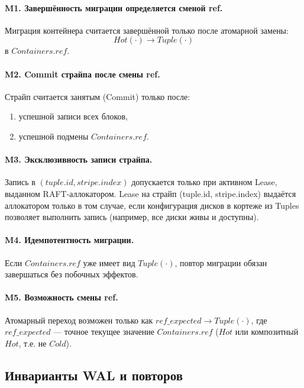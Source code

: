 \documentclass[a4paper,12pt]{article}
\begin{document}
    \paragraph{M1. Завершённость миграции определяется сменой ref.}
    Миграция контейнера считается завершённой только после атомарной замены:
    \[
        Hot(\cdot) \rightarrow Tuple(\cdot)
    \]
    в $Containers.ref$.

    \paragraph{M2. Commit страйпа после смены ref.}
    Страйп считается занятым (Commit) только после:
    \begin{enumerate}
        \item успешной записи всех блоков,
        \item успешной подмены $Containers.ref$.
    \end{enumerate}

    \paragraph{M3. Эксклюзивность записи страйпа.}
    Запись в $(tuple.id, stripe.index)$ допускается только при активном Lease,
    выданном RAFT-аллокатором. Lease на страйп (tuple.id, stripe.index) выдаётся аллокатором только в том случае,
    если конфигурация дисков в кортеже из Tuples позволяет выполнить запись (например, все диски живы и доступны).

    \paragraph{M4. Идемпотентность миграции.}
    Если $Containers.ref$ уже имеет вид $Tuple(\cdot)$, повтор миграции
    обязан завершаться без побочных эффектов.

    \paragraph{M5. Возможность смены ref.}
    Атомарный переход возможен только как $ref\_expected \rightarrow Tuple(\cdot)$, где $ref\_expected$ —
    точное текущее значение $Containers.ref$ ($Hot$ или композитный $Hot$, т.е. не $Cold$).

    \subsection{Инварианты WAL и повторов}
\end{document}
